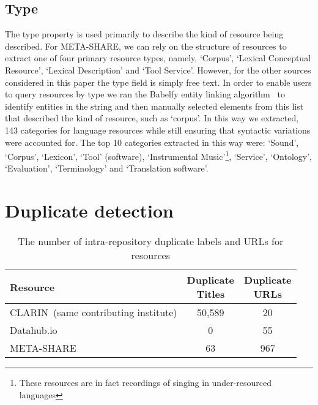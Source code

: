 \documentclass[11pt]{article}
\begin{document}
\subsection{Type}

The type property is used primarily to describe the kind of resource being
described. For META-SHARE, we can rely on the structure of resources to extract
one of four primary resource types, namely, `Corpus', `Lexical Conceptual
Resource', `Lexical Description' and `Tool Service'. However, for the other
sources considered in this paper the type field is simply free text. In order 
to enable users to query resources by type we ran the Babelfy entity linking
algorithm~\cite{Moroetal:14tacl} to identify entities in the string and
then manually selected elements from this list that described the kind of
resource, such as `corpus'. In this way we extracted, 143 categories for
language resources while still ensuring that syntactic variations were accounted
for. The top 10 categories extracted in this way were: `Sound', `Corpus',
`Lexicon', `Tool' (software), `Instrumental Music'\footnote{These
resources are in fact recordings of singing in under-resourced languages}, `Service', `Ontology', `Evaluation',
`Terminology' and `Translation software'.

\section{Duplicate detection}

\label{duplicates}

\begin{table}
    \begin{center}
    \begin{tabular}{l|cc}
        Resource   & \thead{Duplicate \\ Titles} & \thead{Duplicate \\ URLs} \\
        \hline                                                            
        CLARIN{\tiny~(same contributing institute)}     & 50,589           & 20          \\   
        Datahub.io & 0                & 55             \\
        META-SHARE & 63               & 967            \\
    \end{tabular}
    \end{center}
    \caption{\label{tab:self-dupes}The number of intra-repository duplicate labels and URLs for
    resources}
\end{table}
\end{document}
